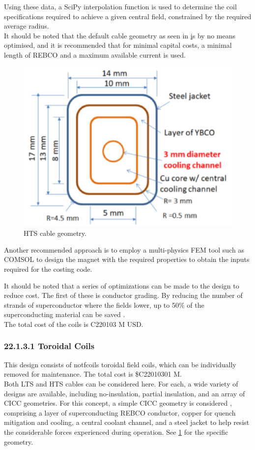 Using these data, a SciPy interpolation function is used to determine the coil specifications required to achieve a given central field, constrained by the required average radius.\\

It should be noted that the default cable geometry as seen in \href{fig:yuhu_cs} is by no means optimised, and it is recommended that for minimal capital costs, a minimal length of REBCO and a maximum available current is used.


\begin{figure}[h]
    \centering
    \includegraphics[width =0.5\linewidth]{StandardFigures/yuhu_cs.pdf}
    \caption{HTS cable geometry.}
    \label{fig:yuhu_cs}
\end{figure}

Another recommended approach is to employ a multi-physics FEM tool such as COMSOL to design the magnet with the required properties to obtain the inputs required for the costing code.

It should be noted that a series of optimizations can be made to the design to reduce cost. The first of these is conductor grading. By reducing the number of strands of superconductor where the fields lower, up to 50\% of the superconducting material can be saved \cite{uglietti2018progressing}.\\

The total cost of the coils is C220103 M USD.


\subsubsection*{22.1.3.1 Toroidal Coils}

This design consists of notfcoils toroidal field coils, which can be individually removed for maintenance. The total cost is \$C22010301 M.\\

Both LTS and HTS cables can be considered here. For each, a wide variety of designs are available, including no-insulation, partial insulation, and an array of CICC geometries. For this concept, a simple CICC geometry is considered \cite{Menard2016}, comprising a layer of superconducting REBCO conductor, copper for quench mitigation and cooling, a central coolant channel, and a steel jacket to help resist the considerable forces experienced during operation. See \ref{fig:yuhu_cs} for the specific geometry.\\

